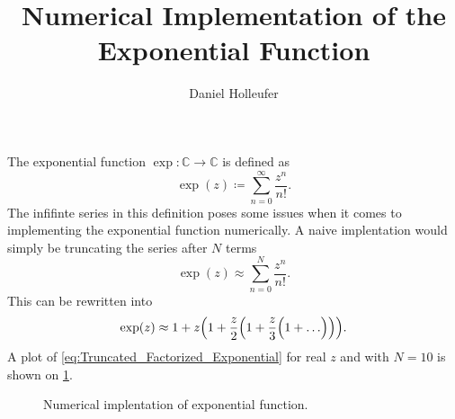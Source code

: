 \documentclass[a4paper, oneside]{memoir}
\title{Numerical Implementation of the Exponential Function}
\author{Daniel Holleufer}
\date{}
\begin{document}
    \maketitle
    \noindent The exponential function $ \exp : \mathbb{C} \to \mathbb{C} $ is defined as
    \begin{equation}
        \exp(z) \coloneqq \sum_{n = 0}^{\infty} \frac{z^n}{n!}.
    \end{equation}
    The infifinte series in this definition poses some issues when it comes to implementing the exponential function numerically.
    A naive implentation would simply be truncating the series after $ N $ terms
    \begin{equation}
        \exp(z) \approx \sum_{n = 0}^{N} \frac{z^n}{n!}.
    \end{equation}
    This can be rewritten into
    \begin{equation}\label{eq:Truncated_Factorized_Exponential}
        \exp(z) \approx 1 + z \Bigl(1 + \frac{z}{2} \Bigl(1 + \frac{z}{3} \Bigl(1 + \ldots\Bigr)\Bigr)\Bigr).
    \end{equation}
    A plot of \cref{eq:Truncated_Factorized_Exponential} for real $ z $ and with $ N = 10 $ is shown on \cref{fig:Plot}.
    \begin{figure}[h]
        \centering
        \caption{Numerical implentation of exponential function.}
        \label{fig:Plot}
    \end{figure}
\end{document}
